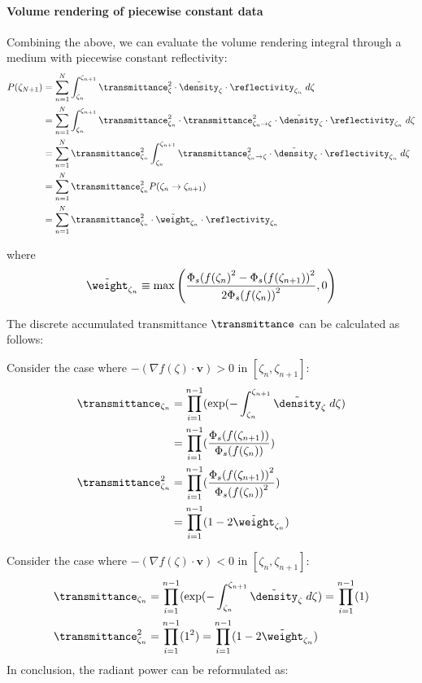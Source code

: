 \paragraph{Volume rendering of piecewise constant data}
Combining the above, we can evaluate the volume rendering integral through a medium with piecewise constant reflectivity:
% 
\begin{align}
P(\zeta_{N+1}) &= \sum_{n=1}^N \int_{\zeta_n}^{\zeta_{n+1}} \transmittance^2_{\zeta} \cdot \tilde{\density}_{\zeta} \cdot \reflectivity_{\zeta_n} \; d\zeta
\\
&= \sum_{n=1}^N \int_{\zeta_n}^{\zeta_{n+1}} \transmittance^2_{\zeta_n} \cdot \transmittance^2_{\zeta_n \rightarrow \zeta} \cdot \tilde{\density}_{\zeta} \cdot \reflectivity_{\zeta_n} \; d\zeta 
\\
&= \sum_{n=1}^N \transmittance^2_{\zeta_n}  \int_{\zeta_n}^{\zeta_{n+1}} \transmittance^2_{\zeta_n \rightarrow \zeta} \cdot \tilde{\density}_{\zeta} \cdot \reflectivity_{\zeta_n} \; d\zeta 
\\
&=\sum_{n=1}^N \transmittance^2_{\zeta_n} P(\zeta_n \rightarrow \zeta_{n+1})
\\
&= \sum_{n=1}^N \transmittance^2_{\zeta_n} \cdot \tilde{\weight}_{\zeta_n} \cdot \reflectivity_{\zeta_n}
\end{align}

where 
\begin{align}
\tilde{\weight}_{\zeta_n} \equiv \max\left(\frac{{\Phi_s(f(\zeta_n)}^2 -{\Phi_s(f(\zeta_{n+1}))}^2}{{2\Phi_s(f(\zeta_n))}^2},0\right)
\end{align}

The discrete accumulated transmittance $\transmittance$ can be calculated as follows:

Consider the case where $-(\nabla f(\zeta)\cdot \mathbf{v}) > 0$ in $[\zeta_n, \zeta_{n+1}]$: 
%
\begin{align}
\transmittance_{\zeta_n} 
&=\prod_{i=1}^{n-1}(\exp(-\int_{\zeta_n}^{\zeta_{n+1}}\tilde{\density}_\zeta \; d\zeta) \\
&= \prod_{i=1}^{n-1}(\frac{\Phi_s(f(\zeta_{n+1}))}{\Phi_s(f(\zeta_n))})\\
\transmittance^2_{\zeta_n}
&= \prod_{i=1}^{n-1}(\frac{{\Phi_s(f(\zeta_{n+1}))}^2}{{\Phi_s(f(\zeta_n))}^2})\\
&= \prod_{i=1}^{n-1}(1-2\tilde{\weight}_{\zeta_n})
\label{eq:dicrete_transmittance}
\end{align}

Consider the case where $-(\nabla f(\zeta)\cdot \mathbf{v}) < 0$ in $[\zeta_n, \zeta_{n+1}]$: 
\begin{align}
\transmittance_{\zeta_n} 
&=\prod_{i=1}^{n-1}(\exp(-\int_{\zeta_n}^{\zeta_{n+1}}\tilde{\density}_\zeta \; d\zeta) = \prod_{i=1}^{n-1}(1)
\\
\transmittance^2_{\zeta_n} &= \prod_{i=1}^{n-1}(1^2) = \prod_{i=1}^{n-1}(1-2\tilde{\weight}_{\zeta_n})
\end{align}
In conclusion, the radiant power can be reformulated as:

